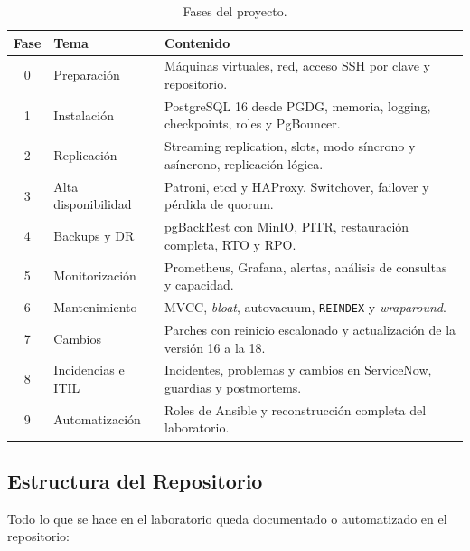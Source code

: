 \documentclass[11pt, a4paper, titlepage]{article}
\newcommand{\cod}[1]{\texttt{#1}}
\begin{document}
\begin{table}[H]
\centering
\small
\begin{tabular}{clp{8.2cm}}
\toprule
\textbf{Fase} & \textbf{Tema} & \textbf{Contenido} \\
\midrule
0 & Preparación & Máquinas virtuales, red, acceso SSH por clave y repositorio. \\
1 & Instalación & PostgreSQL 16 desde PGDG, memoria, logging, checkpoints, roles y PgBouncer. \\
2 & Replicación & Streaming replication, slots, modo síncrono y asíncrono, replicación lógica. \\
3 & Alta disponibilidad & Patroni, etcd y HAProxy. Switchover, failover y pérdida de quorum. \\
4 & Backups y DR & pgBackRest con MinIO, PITR, restauración completa, RTO y RPO. \\
5 & Monitorización & Prometheus, Grafana, alertas, análisis de consultas y capacidad. \\
6 & Mantenimiento & MVCC, \textit{bloat}, autovacuum, \cod{REINDEX} y \textit{wraparound}. \\
7 & Cambios & Parches con reinicio escalonado y actualización de la versión 16 a la 18. \\
8 & Incidencias e ITIL & Incidentes, problemas y cambios en ServiceNow, guardias y postmortems. \\
9 & Automatización & Roles de Ansible y reconstrucción completa del laboratorio. \\
\bottomrule
\end{tabular}
\caption{Fases del proyecto.}
\label{tab:fases}
\end{table}

\subsection{Estructura del Repositorio}

Todo lo que se hace en el laboratorio queda documentado o automatizado en el repositorio:
\end{document}
